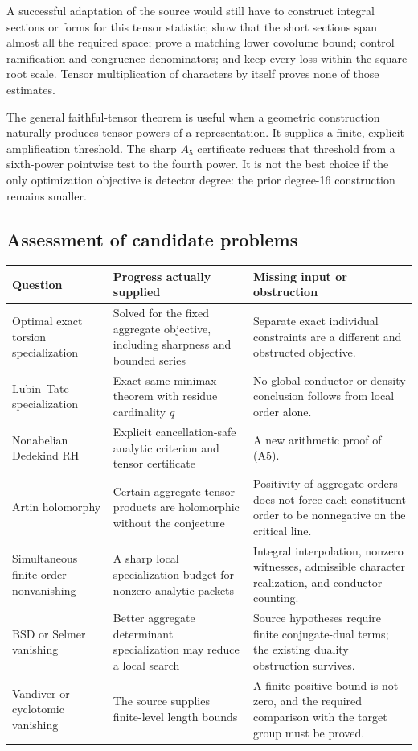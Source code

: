 A successful adaptation of the source would still have to construct integral sections or forms for this tensor statistic; show that the short sections span almost all the required space; prove a matching lower covolume bound; control ramification and congruence denominators; and keep every loss within the square-root scale. Tensor multiplication of characters by itself proves none of those estimates.

The general faithful-tensor theorem is useful when a geometric construction naturally produces tensor powers of a representation. It supplies a finite, explicit amplification threshold. The sharp \(A_5\) certificate reduces that threshold from a sixth-power pointwise test to the fourth power. It is not the best choice if the only optimization objective is detector degree: the prior degree-16 construction remains smaller.

\subsection{Assessment of candidate problems}
\begin{center}
\small
\begin{tabularx}{\textwidth}{@{}p{}XX@{}}
\toprule
Question & Progress actually supplied & Missing input or obstruction\\
\midrule
Optimal exact torsion specialization & Solved for the fixed aggregate objective, including sharpness and bounded series & Separate exact individual constraints are a different and obstructed objective.\\
Lubin--Tate specialization & Exact same minimax theorem with residue cardinality \(q\) & No global conductor or density conclusion follows from local order alone.\\
Nonabelian Dedekind RH & Explicit cancellation-safe analytic criterion and tensor certificate & A new arithmetic proof of (A5).\\
Artin holomorphy & Certain aggregate tensor products are holomorphic without the conjecture & Positivity of aggregate orders does not force each constituent order to be nonnegative on the critical line.\\
Simultaneous finite-order nonvanishing & A sharp local specialization budget for nonzero analytic packets & Integral interpolation, nonzero witnesses, admissible character realization, and conductor counting.\\
BSD or Selmer vanishing & Better aggregate determinant specialization may reduce a local search & Source hypotheses require finite conjugate-dual terms; the existing duality obstruction survives.\\
Vandiver or cyclotomic vanishing & The source supplies finite-level length bounds & A finite positive bound is not zero, and the required comparison with the target group must be proved.\\
\bottomrule
\end{tabularx}
\end{center}

